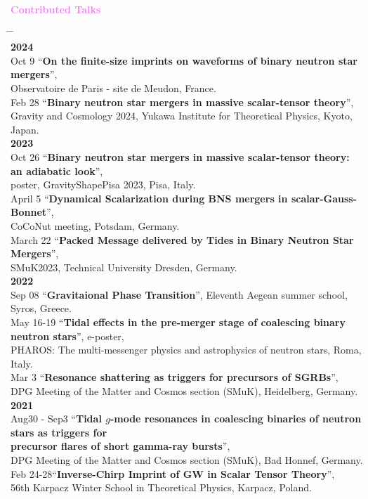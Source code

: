 \documentclass[10pt,floatfix,a4paper]{article}
\newcommand{\hk}[1]{\textcolor{Violet}{#1}}
\begin{document}
{\large \bf \hk{Contributed Talks}}
\begin{tabbing}
  \hspace*{5mm} \= \hspace*{2cm} \= \hspace*{10cm} \\[-3ex]
  \> {\bf 2024} \> \\[1ex]
  \> Oct 9 \> ``\textbf{On the finite-size imprints on waveforms of binary neutron star mergers}'',\\
  \> \> Observatoire de Paris - site de Meudon, France. \\  
  \> Feb 28 \> ``\textbf{Binary neutron star mergers in massive scalar-tensor theory}'',\\
  \> \> Gravity and Cosmology 2024, Yukawa Institute for Theoretical Physics, Kyoto, Japan.\\
  \> {\bf 2023} \> \\[1ex]
  \> Oct 26 \> ``\textbf{Binary neutron star mergers in massive scalar-tensor theory: an
  adiabatic look}'', \\
  \> \> poster, GravityShapePisa 2023, Pisa, Italy.\\
  \> April 5 \> ``\textbf{Dynamical Scalarization during BNS mergers
  in scalar-Gauss-Bonnet}'', \\
  \> \> CoCoNut meeting, Potsdam, Germany.\\
  \> March 22 \> ``\textbf{Packed Message delivered by Tides in
  Binary Neutron Star Mergers}'', \\
  \> \> SMuK2023, Technical University Dresden, Germany.\\
  \> {\bf 2022} \> \\[1ex]
  \> Sep 08 \> ``\textbf{Gravitaional Phase Transition}'', Eleventh Aegean summer school, Syros, Greece.\\
  \> May 16-19 \> ``\textbf{Tidal effects in the pre-merger stage of coalescing binary neutron stars}'', e-poster, \\
  \> \> PHAROS: The multi-messenger physics and astrophysics of neutron stars, Roma, Italy.\\
  \> Mar 3 \> ``\textbf{Resonance shattering as triggers for precursors of SGRBs}'', \\
  \> \> DPG Meeting of the Matter and Cosmos section (SMuK), Heidelberg, Germany.\\
  \> {\bf 2021} \> \\[1ex]
  \> Aug30 - Sep3 \> ``\textbf{Tidal $g$-mode resonances in coalescing binaries of neutron stars as triggers for}\\
  \> \> \textbf{precursor flares of short gamma-ray bursts}'', \\ 
  \> \> DPG Meeting of the Matter and Cosmos section (SMuK), Bad Honnef, Germany. \\
  \> Feb 24-28\>``\textbf{Inverse-Chirp Imprint of GW in Scalar Tensor Theory}'', \\ 
  \> \> 56th Karpacz Winter School in Theoretical Physics, Karpacz, Poland.
\end{tabbing}
\end{document}
